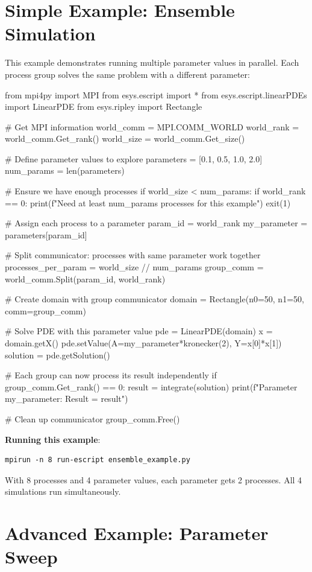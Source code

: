 \section{Simple Example: Ensemble Simulation}

This example demonstrates running multiple parameter values in parallel.
Each process group solves the same problem with a different parameter:

\begin{python}
from mpi4py import MPI
from esys.escript import *
from esys.escript.linearPDEs import LinearPDE
from esys.ripley import Rectangle

# Get MPI information
world_comm = MPI.COMM_WORLD
world_rank = world_comm.Get_rank()
world_size = world_comm.Get_size()

# Define parameter values to explore
parameters = [0.1, 0.5, 1.0, 2.0]
num_params = len(parameters)

# Ensure we have enough processes
if world_size < num_params:
    if world_rank == 0:
        print(f"Need at least {num_params} processes for this example")
    exit(1)

# Assign each process to a parameter
param_id = world_rank %
my_parameter = parameters[param_id]

# Split communicator: processes with same parameter work together
processes_per_param = world_size // num_params
group_comm = world_comm.Split(param_id, world_rank)

# Create domain with group communicator
domain = Rectangle(n0=50, n1=50, comm=group_comm)

# Solve PDE with this parameter value
pde = LinearPDE(domain)
x = domain.getX()
pde.setValue(A=my_parameter*kronecker(2), Y=x[0]*x[1])
solution = pde.getSolution()

# Each group can now process its result independently
if group_comm.Get_rank() == 0:
    result = integrate(solution)
    print(f"Parameter {my_parameter}: Result = {result}")

# Clean up communicator
group_comm.Free()
\end{python}

\textbf{Running this example}:
\begin{verbatim}
mpirun -n 8 run-escript ensemble_example.py
\end{verbatim}

With 8 processes and 4 parameter values, each parameter gets 2 processes.
All 4 simulations run simultaneously.

\section{Advanced Example: Parameter Sweep}

